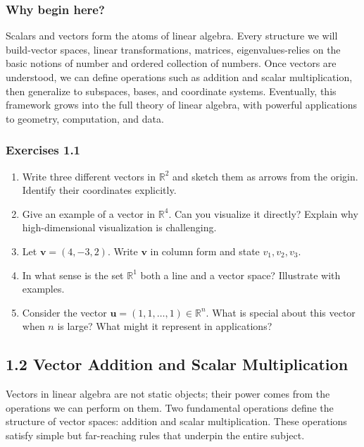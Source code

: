 \documentclass[
  12pt,
  a4paper,
]{article}
\begin{document}
\subsubsection{Why begin here?}\label{why-begin-here}

Scalars and vectors form the atoms of linear algebra. Every structure we
will build-vector spaces, linear transformations, matrices,
eigenvalues-relies on the basic notions of number and ordered collection
of numbers. Once vectors are understood, we can define operations such
as addition and scalar multiplication, then generalize to subspaces,
bases, and coordinate systems. Eventually, this framework grows into the
full theory of linear algebra, with powerful applications to geometry,
computation, and data.

\subsubsection{Exercises 1.1}\label{exercises-11}

\begin{enumerate}
\def\labelenumi{\arabic{enumi}.}
\item
  Write three different vectors in \(\mathbb{R}^2\) and sketch them as
  arrows from the origin. Identify their coordinates explicitly.
\item
  Give an example of a vector in \(\mathbb{R}^4\). Can you visualize it
  directly? Explain why high-dimensional visualization is challenging.
\item
  Let \(\mathbf{v} = (4, -3, 2)\). Write \(\mathbf{v}\) in column form
  and state \(v_1, v_2, v_3\).
\item
  In what sense is the set \(\mathbb{R}^1\) both a line and a vector
  space? Illustrate with examples.
\item
  Consider the vector \(\mathbf{u} = (1,1,\dots,1) \in \mathbb{R}^n\).
  What is special about this vector when \(n\) is large? What might it
  represent in applications?
\end{enumerate}

\subsection{1.2 Vector Addition and Scalar
Multiplication}\label{12-vector-addition-and-scalar-multiplication}

Vectors in linear algebra are not static objects; their power comes from
the operations we can perform on them. Two fundamental operations define
the structure of vector spaces: addition and scalar multiplication.
These operations satisfy simple but far-reaching rules that underpin the
entire subject.
\end{document}
